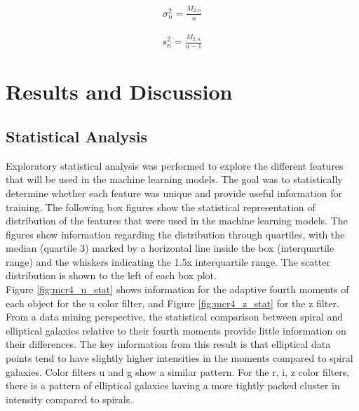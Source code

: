 \documentclass[11pt,sigconf]{acmart}
\begin{document}
\begin{equation} \label{eqn_w2}
  \begin{split}
    \sigma_{n}^{2}=\frac{M_{2,n}}{n}
  \end{split}
\end{equation}

\begin{equation} \label{eqn_w3}
  \begin{split}
    s_{n}^{2}=\frac{M_{2,n}}{n-1}
  \end{split}
\end{equation}




\section{Results and Discussion}

 
\subsection{Statistical Analysis}

Exploratory statistical analysis was performed to explore the different 
features that will be used in the machine learning models. The goal was to 
statistically determine whether each feature was unique and provide useful 
information for training. The following box figures show the statistical 
representation of distribution of the features that were used in the machine 
learning models. The figures show information regarding the distribution 
through quartiles, with the median (quartile 3) marked by a horizontal line 
inside the box (interquartile range) and the whiskers indicating the 1.5x 
interquartile range. The scatter distribution is shown to the left of each 
box plot. \\

Figure \ref{fig:mcr4_u_stat} shows information for the adaptive fourth 
moments of each object for the u color filter, and Figure \ref{fig:mcr4_z_stat} 
for the z filter. From a data mining perspective, the statistical comparison 
between spiral and elliptical galaxies relative to their fourth moments provide 
little information on their differences. The key information from this result is 
that elliptical data points tend to have slightly higher intensities in the 
moments compared to spiral galaxies. Color filters u and g show a similar pattern. 
For the r, i, z color filters, there is a pattern of elliptical galaxies having a 
more tightly packed cluster in intensity compared to spirals.
\end{document}
